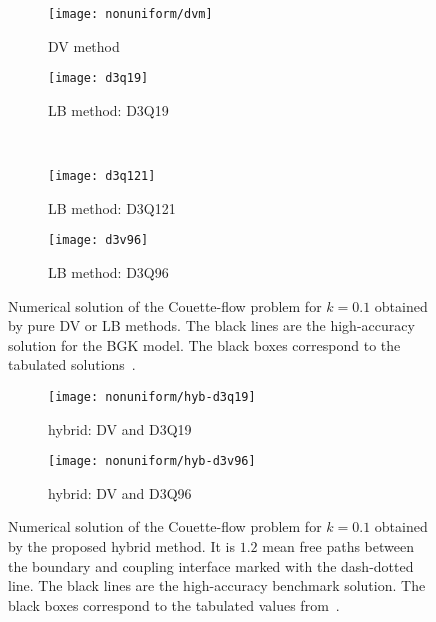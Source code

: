 \documentclass{elsarticle} %
\begin{document}
\begin{figure}
    \centering
    \begin{subfigure}[b]{0.5\textwidth}
        \texttt{[image: nonuniform/dvm]}
        \caption{DV method}
        \label{fig:dvm}
    \end{subfigure}%
    \begin{subfigure}[b]{0.5\textwidth}
        \texttt{[image: d3q19]}
        \caption{LB method: D3Q19}
        \label{fig:d3q19}
    \end{subfigure}\\
    \begin{subfigure}[b]{0.5\textwidth}
        \texttt{[image: d3q121]}
        \caption{LB method: D3Q121}
        \label{fig:d3q121}
    \end{subfigure}%
    \begin{subfigure}[b]{0.5\textwidth}
        \texttt{[image: d3v96]}
        \caption{LB method: D3Q96}
        \label{fig:d3q96}
    \end{subfigure}
    \caption{
        Numerical solution of the Couette-flow problem for \(k=0.1\) obtained by pure DV or LB methods.
        The black lines are the high-accuracy solution for the BGK model.
        The black boxes correspond to the tabulated solutions~\cite{Luo2016}.
    }\label{fig:pure}
\end{figure}

\begin{figure}
    \centering
    \begin{subfigure}[b]{0.5\textwidth}
        \texttt{[image: nonuniform/hyb-d3q19]}
        \caption{hybrid: DV and D3Q19}
        \label{fig:hyb:d3q19}
    \end{subfigure}%
    \begin{subfigure}[b]{0.5\textwidth}
        \texttt{[image: nonuniform/hyb-d3v96]}
        \caption{hybrid: DV and D3Q96}
        \label{fig:hyb:d3v96}
    \end{subfigure}
    \caption{
        Numerical solution of the Couette-flow problem for \(k=0.1\) obtained by the proposed hybrid method.
        It is \(1.2\) mean free paths between the boundary and coupling interface marked with the dash-dotted line.
        The black lines are the high-accuracy benchmark solution.
        The black boxes correspond to the tabulated values from~\cite{Luo2016}.
    }\label{fig:hybrid}
\end{figure}
\end{document}

